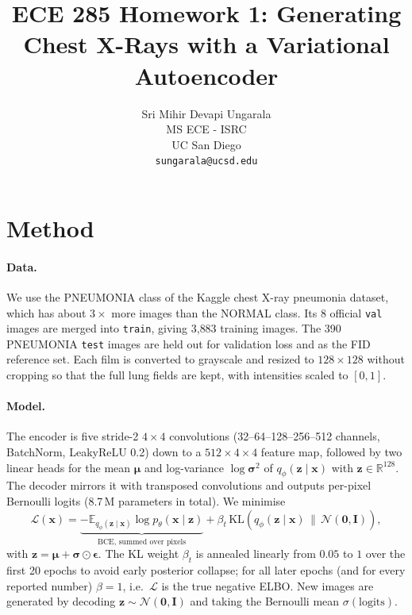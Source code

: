 \documentclass{article}
\title{ECE 285 Homework 1: Generating Chest X-Rays with a Variational Autoencoder}
\author{%
  Sri Mihir Devapi Ungarala \\
  MS ECE - ISRC\\
  UC San Diego\\
  \texttt{sungarala@ucsd.edu}}
\newcommand{\vect}[1]{\mathbf{#1}}
\begin{document}
\maketitle

\section{Method}

\paragraph{Data.}
We use the PNEUMONIA class of the Kaggle chest X-ray pneumonia dataset,
which has about $3\times$ more images than the NORMAL class. Its 8 official
\texttt{val} images are merged into \texttt{train}, giving 3{,}883 training
images. The 390 PNEUMONIA \texttt{test} images are held out for validation
loss and as the FID reference set. Each film is converted to grayscale and resized to
$128\times128$ without cropping so that the full lung fields are kept, with
intensities scaled to $[0,1]$.

\paragraph{Model.}
The encoder is five stride-2 $4\times4$ convolutions
(32--64--128--256--512 channels, BatchNorm, LeakyReLU 0.2) down to a
$512\times4\times4$ feature map, followed by two linear heads for the mean
$\boldsymbol{\mu}$ and log-variance $\log\boldsymbol{\sigma}^2$ of
$q_\phi(\vect{z}\mid\vect{x})$ with $\vect{z}\in\mathbb{R}^{128}$. The decoder
mirrors it with transposed convolutions and outputs per-pixel Bernoulli
logits (8.7\,M parameters in total). We minimise
\begin{equation}
\mathcal{L}(\vect{x}) =
\underbrace{-\mathbb{E}_{q_\phi(\vect{z}\mid\vect{x})}\log p_\theta(\vect{x}\mid\vect{z})}_{\text{BCE, summed over pixels}}
+ \beta_t\, \mathrm{KL}\!\left(q_\phi(\vect{z}\mid\vect{x})\,\|\,\mathcal{N}(\vect{0},\vect{I})\right),
\end{equation}
with $\vect{z}=\boldsymbol{\mu}+\boldsymbol{\sigma}\odot\boldsymbol{\epsilon}$.
The KL weight $\beta_t$ is annealed linearly from $0.05$ to $1$ over the first
20 epochs to avoid early posterior collapse; for all later epochs (and for every
reported number) $\beta=1$, i.e.\ $\mathcal{L}$ is the true negative ELBO.
New images are generated by decoding $\vect{z}\sim\mathcal{N}(\vect{0},\vect{I})$
and taking the Bernoulli mean $\sigma(\text{logits})$.
\end{document}
